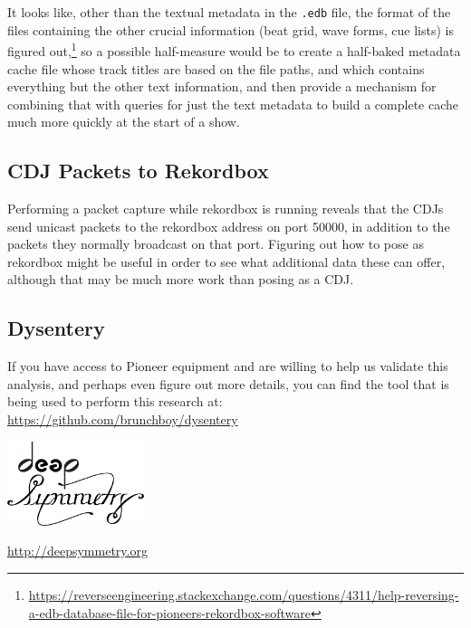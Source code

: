 \documentclass[11pt]{article}
\begin{document}
It looks like, other than the textual metadata in the {\tt .edb} file,
the format of the files containing the other crucial information (beat
grid, wave forms, cue lists) is figured
out,\footnote{\url{https://reverseengineering.stackexchange.com/questions/4311/help-reversing-a-edb-database-file-for-pioneers-rekordbox-software}}
so a possible half-measure would be to create a half-baked metadata
cache file whose track titles are based on the file paths, and which
contains everything but the other text information, and then provide a
mechanism for combining that with queries for just the text metadata
to build a complete cache much more quickly at the start of a show.

\subsection{CDJ Packets to Rekordbox}

Performing a packet capture while rekordbox is running reveals that
the CDJs send unicast packets to the rekordbox address on port 50000,
in addition to the packets they normally broadcast on that port.
Figuring out how to pose as rekordbox might be useful in order to see
what additional data these can offer, although that may be much more
work than posing as a CDJ.

\subsection{Dysentery}

If you have access to Pioneer equipment and are willing to help us
validate this analysis, and perhaps even figure out more details, you
can find the tool that is being used to perform this research at: \\
\url{https://github.com/brunchboy/dysentery}

\begin{appendix}

  \listoffigures

  \listoftables

  \begin{center}
    \begin{samepage}
      \includegraphics[width=4cm]{assets/DS-Logo-bw-4k}

      \vspace{0.25cm}
      \url{http://deepsymmetry.org}
    \end{samepage}
  \end{center}

\end{appendix}
\end{document}

